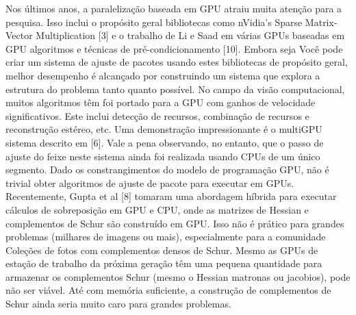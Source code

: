 \begin{itemize}
Nos últimos anos, a paralelização baseada em GPU atraiu muita atenção para a pesquisa. Isso inclui o propósito geral
bibliotecas como nVidia's Sparse Matrix-Vector Multiplication
[3] e o trabalho de Li e Saad em várias GPUs baseadas em GPU
algoritmos e técnicas de pré-condicionamento [10]. Embora seja
Você pode criar um sistema de ajuste de pacotes usando estes
bibliotecas de propósito geral, melhor desempenho é alcançado por
construindo um sistema que explora a estrutura do problema
tanto quanto possível.
No campo da visão computacional, muitos algoritmos têm
foi portado para a GPU com ganhos de velocidade significativos. Este
inclui detecção de recursos, combinação de recursos e reconstrução estéreo,
etc. Uma demonstração impressionante é o multiGPU
sistema descrito em [6]. Vale a pena
observando, no entanto, que o passo de ajuste do feixe neste sistema
ainda foi realizada usando CPUs de um único segmento.
Dado os constrangimentos do modelo de programação GPU,
não é trivial obter algoritmos de ajuste de pacote para executar
em GPUs. Recentemente, Gupta et al [8] tomaram uma abordagem híbrida
para executar cálculos de sobreposição em GPU e CPU,
onde as matrizes de Hessian e complementos de Schur são
construído em GPU. Isso não é prático para grandes problemas
(milhares de imagens ou mais), especialmente para a comunidade
Coleções de fotos com complementos densos de Schur.
Mesmo as GPUs de estação de trabalho da próxima geração têm uma pequena quantidade
para armazenar os complementos Schur (mesmo o Hessian
matronas ou jacobios), pode não ser viável. Até
com memória suficiente, a construção de complementos de Schur
ainda seria muito caro para grandes problemas.





\end{itemize}
